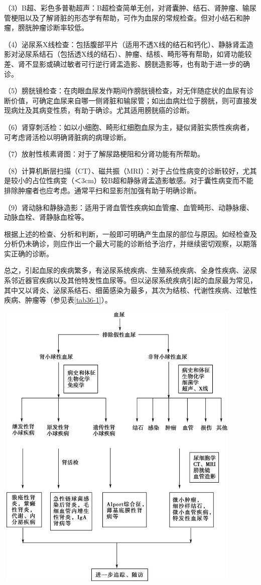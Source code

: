 （3）B超、彩色多普勒超声：B超检查简单无创，对肾囊肿、结石、肾肿瘤、输尿管梗阻以及了解肾脏的形态学有帮助，可作为血尿的常规检查。但对小结石和肿瘤，膀胱肿瘤诊断率较低。

（4）泌尿系X线检查：包括腹部平片（适用不透X线的结石和钙化）、静脉肾盂造影对泌尿系结石（包括透X线的结石）、肿瘤、结核、畸形等有帮助，如肾功能较差、肾不显影或碘过敏者可行逆行肾盂造影、膀胱造影等，也有助于进一步的确诊。

（5）膀胱镜检查：在肉眼血尿发作期间作膀胱镜检查，对无伴随症状的血尿有诊断价值，可确定血尿来自哪一侧肾脏和输尿管；如出血病灶位于膀胱，则可直接发现病灶及其病变性质，有助于确诊。尤其适用膀胱癌的诊断。

（6）肾穿刺活检：如以小细胞、畸形红细胞血尿为主，疑似肾脏实质性疾病者，可考虑肾活检以明确肾脏病的病理诊断。

（7）放射性核素肾图：对于了解尿路梗阻和分肾功能有所帮助。

（8）计算机断层扫描（CT）、磁共振（MRI）：对于占位性病变的诊断较好，尤其是较小的占位性病变（＜3cm）较B超和静脉肾盂造影敏感。对于囊性病变而不能排除肿瘤者也应考虑。通常平扫和显影剂加强有助于明确诊断。

（9）肾动脉和静脉造影：适用于肾血管性疾病如血管瘤、血管畸形、动静脉瘘、动脉血栓、肾静脉血栓等。

根据上述的检查、分析和判断，一般即可明确产生血尿的部位与原因。如经检查及分析仍未确诊，则应作出一个最大可能的诊断给予治疗，并继续密切观察，以期落实正确的诊断。

总之，引起血尿的疾病繁多，有泌尿系统疾病、生殖系统疾病、全身性疾病、泌尿系邻近器官疾病以及其他特发性血尿等。但以泌尿系统疾病引起的血尿最为常见，其中又以肾炎、泌尿系结石、细菌感染为最多，其次为结核、代谢性疾病、过敏性疾病、肿瘤等（参见表\ref{tab36-1}）。

\includegraphics[width=4.6875in,height=5.58333in]{./images/Image00223.jpg}

